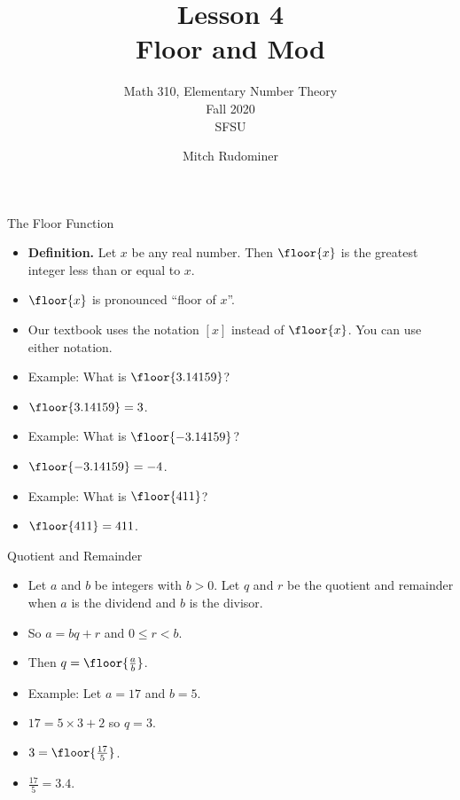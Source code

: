 \documentclass[handout]{beamer}
\title{Lesson 4 \\ Floor and Mod}
\subtitle{Math 310, Elementary Number Theory \\ Fall 2020 \\ SFSU}
\author{Mitch Rudominer}
\date{}
\begin{document}
\begin{frame}
  \titlepage
\end{frame}


\begin{frame}{The Floor Function}

\begin{itemize}
  \item \textbf{Definition.} Let $x$ be any real number. Then $\floor{x}$ is the greatest integer less than or equal to $x$.
  \item $\floor{x}$ is pronounced ``floor of $x$''.
  \item Our textbook uses the notation $[x]$ instead of $\floor{x}$. You can use either notation.
  \item Example: What is $\floor{3.14159}$?
  \item $\floor{3.14159} = 3$.
  \item Example: What is $\floor{-3.14159}$?
  \item $\floor{-3.14159} = -4$.
  \item Example: What is $\floor{411}$?
  \item $\floor{411} = 411$.
\end{itemize}

\end{frame}

\begin{frame}{Quotient and Remainder}

\begin{itemize}
  \item Let $a$ and $b$ be integers with $b>0$. Let $q$ and $r$ be the quotient
  and remainder when $a$ is the dividend and $b$ is the divisor.
  \item So $a = bq + r$ and $0\leq r < b$.
  \item Then $q = \floor{\frac{a}{b}}$.
  \item Example: Let $a = 17$ and $b=5$.
  \item $17 = 5 \times 3 + 2$ so $q=3$.
  \item $3 = \floor{\frac{17}{5}}$.
  \item $\frac{17}{5} = 3.4$.
\end{itemize}

\end{frame}
\end{document}
